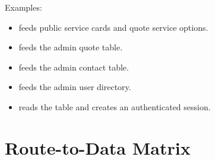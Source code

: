 \documentclass[11pt,a4paper]{article}
\begin{document}
Examples:

\begin{itemize}
    \item {} feeds public service cards and quote service options.
    \item {} feeds the admin quote table.
    \item {} feeds the admin contact table.
    \item {} feeds the admin user directory.
    \item {} reads the  table and creates an authenticated session.
\end{itemize}

\section{Route-to-Data Matrix}
\end{document}
